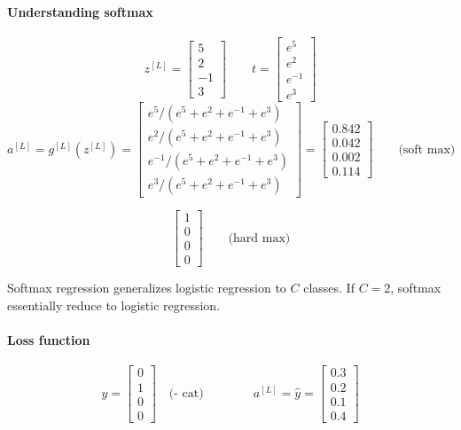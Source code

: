 \documentclass[UTF8]{article}
\newcommand{\Vector}[1]{\boldsymbol{\mathit{#1}}}   %
\begin{document}
\paragraph{Understanding softmax}
$$ z^{[L]} = \left[\begin{array}{c} 5 \\ 2 \\ -1 \\ 3 \end{array}\right] \qquad
t = \left[\begin{array}{c} e^5 \\ e^2 \\ e^{-1} \\ e^3 \end{array}\right] $$
$$ a^{[L]} = g^{[L]}(z^{[L]}) = \left[\begin{array}{c} e^5/(e^5+e^2+e^{-1}+e^3) \\
e^2/(e^5+e^2+e^{-1}+e^3) \\ e^{-1}/(e^5+e^2+e^{-1}+e^3) \\ e^3/(e^5+e^2+e^{-1}+e^3)
\end{array}\right] = \left[\begin{array}{c} 0.842 \\ 0.042 \\ 0.002 \\ 0.114 \end{array}\right]
\qquad \text{(soft max)}$$

$$ \left[\begin{array}{c} 1 \\ 0 \\ 0 \\ 0 \end{array}\right] \qquad \text{(hard max)} $$

Softmax regression generalizes logistic regression to $C$ classes. If $C = 2$, softmax essentially
reduce to logistic regression.

\paragraph{Loss function}
$$ \Vector{y} = \left[\begin{array}{c} 0 \\ 1 \\ 0 \\ 0 \end{array}\right] \quad \text{(- cat)}
\qquad \qquad \Vector{a^{[L]}} = \hat{\Vector{y}}
= \left[\begin{array}{c} 0.3 \\ 0.2 \\ 0.1 \\ 0.4 \end{array}\right] $$
\end{document}
